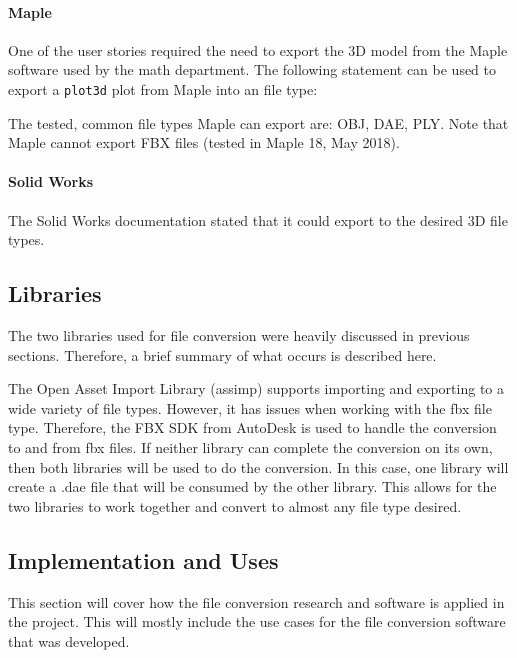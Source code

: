             \paragraph{Maple}

                One of the user stories required the need to export the 3D model from the Maple software used by the math department.  The following statement can be used to export a \texttt{plot3d} plot from Maple into an file type:

                

                The tested, common file types Maple can export are: OBJ, DAE, PLY.  Note that Maple cannot export FBX files (tested in Maple 18, May 2018).

            \paragraph{Solid Works}
                
            The Solid Works documentation stated that it could export to the desired 3D file types.

    \subsection{Libraries}

        The two libraries used for file conversion were heavily discussed in previous sections.  Therefore, a brief summary of what occurs is described here.

        The Open Asset Import Library (assimp) supports importing and exporting to a wide variety of file types.  However, it has issues when working with the fbx file type.  Therefore, the FBX SDK from AutoDesk is used to handle the conversion to and from fbx files.  If neither library can complete the conversion on its own, then both libraries will be used to do the conversion.  In this case, one library will create a .dae file that will be consumed by the other library.  This allows for the two libraries to work together and convert to almost any file type desired.

    \subsection{Implementation and Uses}

        This section will cover how the file conversion research and software is applied in the project.  This will mostly include the use cases for the file conversion software that was developed.

